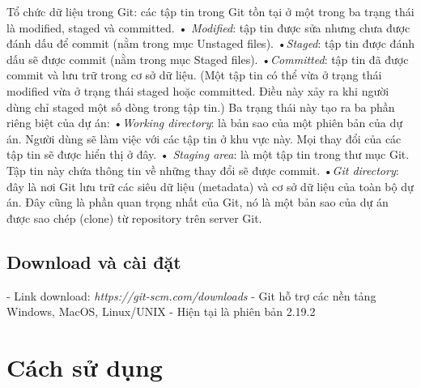 \documentclass[12pt,a4paper]{report}
\begin{document}
Tổ chức dữ liệu trong Git: các tập tin trong Git tồn tại ở một trong ba trạng thái là modified, staged và committed.\vskip 0.4cm
•	{\it Modified}: tập tin được sửa nhưng chưa được đánh dấu để commit (nằm trong mục Unstaged files).\vskip 0.4cm
•{\it	Staged}: tập tin được đánh dấu sẽ được commit (nằm trong mục Staged files).\vskip 0.4cm
•{\it	Committed}: tập tin đã được commit và lưu trữ trong cơ sở dữ liệu.\vskip 0.4cm
(Một tập tin có thể vừa ở trạng thái modified vừa ở trạng thái staged hoặc committed. Điều này xảy ra khi người dùng chỉ staged một số dòng trong tập tin.)\vskip 0.4cm
Ba trạng thái này tạo ra ba phần riêng biệt của dự án:\vskip 0.4cm
•{\it	Working directory}: là bản sao của một phiên bản của dự án. Người dùng sẽ làm việc với các tập tin ở khu vực này. Mọi thay đổi của các tập tin sẽ được hiển thị ở đây.\vskip 0.4cm
•	{\it Staging area}: là một tập tin trong thư mục Git. Tập tin này chứa thông tin về những thay đổi sẽ được commit.\vskip 0.4cm
•{\it	Git directory}: đây là nơi Git lưu trữ các siêu dữ liệu (metadata) và cơ sở dữ liệu của toàn bộ dự án. Đây cũng là phần quan trọng nhất của Git, nó là một bản sao của dự án được sao chép (clone) từ repository trên server Git.\vskip 0.4cm

\newpage
\section{Download và cài đặt}


\hspace{0.6cm}- Link download: {\it https://git-scm.com/downloads \vskip 0.4cm}
- Git hỗ trợ các nền tảng Windows, MacOS, Linux/UNIX\vskip 0.4cm
- Hiện tại là phiên bản 2.19.2\vskip 0.4cm


\newpage %





\chapter{Cách sử dụng} 
\end{document}
